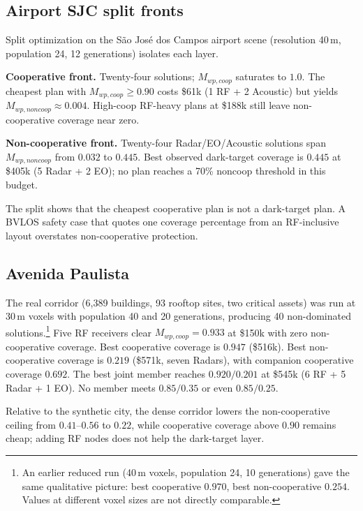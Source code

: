 \subsection{Airport SJC split fronts}
\label{sec:results_airport}

Split optimization on the São José dos Campos airport scene (resolution 40\,m, population 24, 12 generations) isolates each layer.

\textbf{Cooperative front.} Twenty-four solutions; \(M_{wp,coop}\) saturates to \(1.0\). The cheapest plan with \(M_{wp,coop}\geq0.90\) costs \$61k (1 RF + 2 Acoustic) but yields \(M_{wp,noncoop}\approx0.004\). High-coop RF-heavy plans at \$188k still leave non-cooperative coverage near zero.

\textbf{Non-cooperative front.} Twenty-four Radar/EO/Acoustic solutions span \(M_{wp,noncoop}\) from \(0.032\) to \(0.445\). Best observed dark-target coverage is \(0.445\) at \$405k (5 Radar + 2 EO); no plan reaches a 70\% noncoop threshold in this budget.

The split shows that the cheapest cooperative plan is not a dark-target plan. A BVLOS safety case that quotes one coverage percentage from an RF-inclusive layout overstates non-cooperative protection.

\subsection{Avenida Paulista}
\label{sec:results_paulista}

The real corridor (6,389 buildings, 93 rooftop sites, two critical assets) was run at 30\,m voxels with population 40 and 20 generations, producing 40 non-dominated solutions.\footnote{An earlier reduced run (40\,m voxels, population 24, 10 generations) gave the same qualitative picture: best cooperative \(0.970\), best non-cooperative \(0.254\). Values at different voxel sizes are not directly comparable.} Five RF receivers clear \(M_{wp,coop}=0.933\) at \$150k with zero non-cooperative coverage. Best cooperative coverage is \(0.947\) (\$516k). Best non-cooperative coverage is \(0.219\) (\$571k, seven Radars), with companion cooperative coverage \(0.692\). The best joint member reaches \(0.920/0.201\) at \$545k (6 RF + 5 Radar + 1 EO). No member meets \(0.85/0.35\) or even \(0.85/0.25\).

Relative to the synthetic city, the dense corridor lowers the non-cooperative ceiling from \(0.41\)--\(0.56\) to \(0.22\), while cooperative coverage above \(0.90\) remains cheap; adding RF nodes does not help the dark-target layer.

